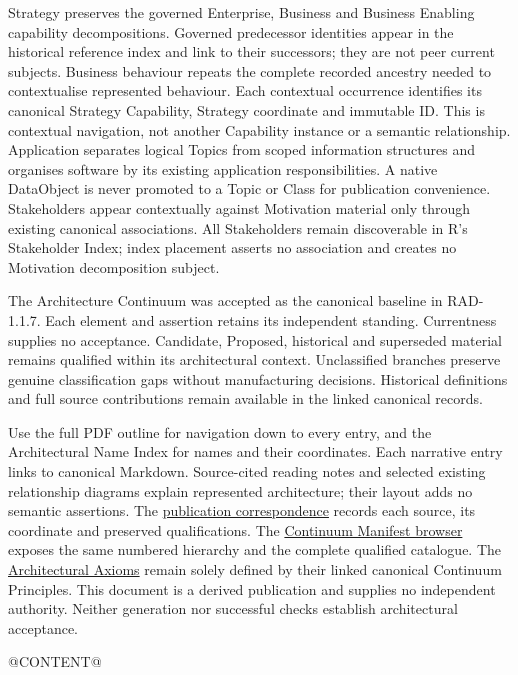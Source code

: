 \documentclass[10pt,a4paper,oneside,headings=small]{scrreprt}
\begin{document}
Strategy preserves the governed Enterprise, Business and Business Enabling
capability decompositions. Governed predecessor identities appear in the historical
reference index and link to their successors; they are not peer current subjects.
Business behaviour repeats the complete recorded ancestry needed to contextualise
represented behaviour. Each contextual occurrence identifies its canonical Strategy
Capability, Strategy coordinate and immutable ID. This is contextual navigation,
not another Capability instance or a semantic relationship. Application separates logical Topics
from scoped information structures and organises software by its existing
application responsibilities. A native DataObject is never promoted to a Topic
or Class for publication convenience. Stakeholders appear contextually against
Motivation material only through existing canonical associations. All Stakeholders
remain discoverable in R's Stakeholder Index; index placement asserts no association
and creates no Motivation decomposition subject.

The Architecture Continuum was accepted as the canonical baseline in RAD-1.1.7.
Each element and assertion retains its independent standing. Currentness supplies
no acceptance. Candidate, Proposed, historical and superseded material remains
qualified within its architectural context. Unclassified branches preserve genuine
classification gaps without manufacturing decisions. Historical definitions and
full source contributions remain available in the linked canonical records.

Use the full PDF outline for navigation down to every entry, and the Architectural
Name Index for names and their coordinates. Each narrative entry links to canonical
Markdown. Source-cited reading notes and selected existing relationship diagrams
explain represented architecture; their layout adds no semantic assertions.
The \href{structure.json}{publication correspondence} records each source, its
coordinate and preserved qualifications. The
\href{../../../continuum-manifest/published/@VERSION@/continuum.html}{Continuum Manifest browser}
exposes the same numbered hierarchy and the complete qualified catalogue.
The \href{../../../../governance/architectural-axioms.md}{Architectural Axioms}
remain solely defined by their linked canonical Continuum Principles.
This document is a derived publication and supplies no independent authority.
Neither generation nor successful checks establish architectural acceptance.

\clearpage
{}
@CONTENT@
\clearpage
{}
{}
\renewcommand{\indexname}{Architectural Name Index}
\printindex
\end{document}
